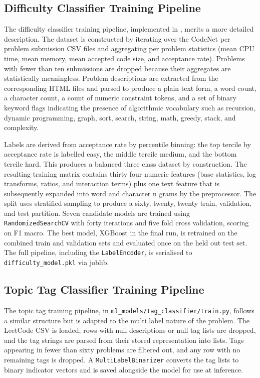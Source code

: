 \subsection{Difficulty Classifier Training Pipeline}

The difficulty classifier training pipeline, implemented in
,
merits a more detailed description. The dataset is constructed by
iterating over the CodeNet \cite{puri2021codenet} per problem submission
CSV files and aggregating per problem statistics (mean CPU time, mean
memory, mean accepted code size, and acceptance rate). Problems with
fewer than ten submissions are dropped because their aggregates are
statistically meaningless. Problem descriptions are extracted from the
corresponding HTML files and parsed to produce a plain text form, a
word count, a character count, a count of numeric constraint tokens,
and a set of binary keyword flags indicating the presence of
algorithmic vocabulary such as recursion, dynamic programming, graph,
sort, search, string, math, greedy, stack, and complexity.

Labels are derived from acceptance rate by percentile binning: the top
tercile by acceptance rate is labelled easy, the middle tercile medium,
and the bottom tercile hard. This produces a balanced three class
dataset by construction. The resulting training matrix contains thirty
four numeric features (base statistics, log transforms, ratios, and
interaction terms) plus one text feature that is subsequently expanded
into word and character n grams by the preprocessor. The split uses
stratified sampling to produce a sixty, twenty, twenty train, validation,
and test partition. Seven candidate models are trained using
\texttt{RandomizedSearchCV} \cite{bergstra2012random} with forty
iterations and five fold cross validation, scoring on F1 macro. The
best model, XGBoost \cite{chen2016xgboost} in the final run, is
retrained on the combined train and validation sets and evaluated once
on the held out test set. The full pipeline, including the
\texttt{LabelEncoder}, is serialised to \texttt{difficulty\_model.pkl} via joblib.

\subsection{Topic Tag Classifier Training Pipeline}

The topic tag training pipeline, in \texttt{ml\_models/tag\_classifier/train.py},
follows a similar structure but is adapted to the multi label nature of
the problem. The LeetCode \cite{leetcode2025} CSV is loaded, rows with
null descriptions or null tag lists are dropped, and the tag strings
are parsed from their stored representation into lists. Tags appearing
in fewer than sixty problems are filtered out, and any row with no
remaining tags is dropped. A \texttt{MultiLabelBinarizer} converts the
tag lists to binary indicator vectors and is saved alongside the model
for use at inference.


